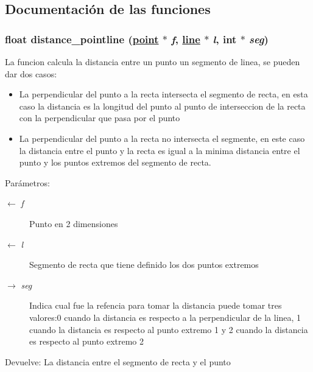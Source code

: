 \subsection{Documentaci\'{o}n de las funciones}
\hypertarget{group__distance_g69a59a49134b784b0c8797e0e83e7c40_g69a59a49134b784b0c8797e0e83e7c40}{
\subsubsection[distance\_\-pointline]{\setlength{\rightskip}{0pt plus 5cm}float distance\_\-pointline (\hyperlink{struct__point}{point} $\ast$ {\em f}, \hyperlink{struct__line}{line} $\ast$ {\em l}, int $\ast$ {\em seg})}}
\label{group__distance_g69a59a49134b784b0c8797e0e83e7c40_g69a59a49134b784b0c8797e0e83e7c40}


La funcion calcula la distancia entre un punto un segmento de linea, se pueden dar dos casos:\begin{itemize}
\item La perpendicular del punto a la recta intersecta el segmento de recta, en esta caso la distancia es la longitud del punto al punto de interseccion de la recta con la perpendicular que pasa por el punto\end{itemize}


\begin{itemize}
\item La perpendicular del punto a la recta no intersecta el segmente, en este caso la distancia entre el punto y la recta es igual a la minima distancia entre el punto y los puntos extremos del segmento de recta.\end{itemize}


\begin{Desc}
\item[Par\'{a}metros:]
\begin{description}
\item[\mbox{$\leftarrow$} {\em f}]Punto en 2 dimensiones \item[\mbox{$\leftarrow$} {\em l}]Segmento de recta que tiene definido los dos puntos extremos \item[\mbox{$\rightarrow$} {\em seg}]Indica cual fue la refencia para tomar la distancia puede tomar tres valores:0 cuando la distancia es respecto a la perpendicular de la linea, 1 cuando la distancia es respecto al punto extremo 1 y 2 cuando la distancia es respecto al punto extremo 2 \end{description}
\end{Desc}
\begin{Desc}
\item[Devuelve:]La distancia entre el segmento de recta y el punto \end{Desc}


